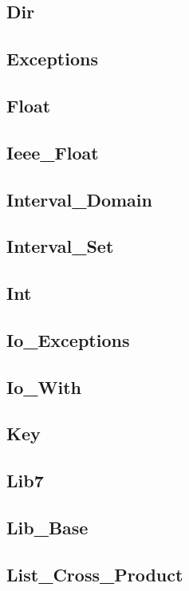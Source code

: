 \subsection{Dir}					
\subsection{Exceptions}					
\subsection{Float}					
\subsection{Ieee\_Float}				
\subsection{Interval\_Domain}				
\subsection{Interval\_Set}				
\subsection{Int}					
\subsection{Io\_Exceptions}				
\subsection{Io\_With}					
\subsection{Key}					
\subsection{Lib7}					
\subsection{Lib\_Base}					
\subsection{List\_Cross\_Product}			
